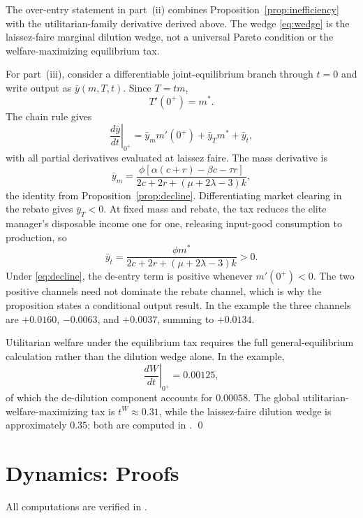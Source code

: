 \documentclass[12pt,letterpaper]{article}
\theoremstyle{definition}
\begin{document}
The over-entry statement in part~(ii) combines Proposition~\ref{prop:inefficiency} with the utilitarian-family derivative derived above.
The wedge \eqref{eq:wedge} is the laissez-faire marginal dilution wedge, not a universal Pareto condition or the welfare-maximizing equilibrium tax.

For part~(iii), consider a differentiable joint-equilibrium branch through $t=0$ and write output as $\bar y(m,T,t)$.
Since $T=tm$,
\[
  T'(0^+)=m^\ast.
\]
The chain rule gives
\[
  \left.\frac{d\bar y}{dt}\right|_{0^+}
  =
  \bar y_m m'(0^+)+\bar y_Tm^\ast+\bar y_t,
\]
with all partial derivatives evaluated at laissez faire.
The mass derivative is
\[
  \bar y_m
  =
  \frac{\phi[\alpha(c+r)-\beta c-\tau r]}
  {2c+2r+(\mu+2\lambda-3)k},
\]
the identity from Proposition~\ref{prop:decline}.
Differentiating market clearing in the rebate gives $\bar y_T<0$.
At fixed mass and rebate, the tax reduces the elite manager's disposable income one for one, releasing input-good consumption to production, so
\[
  \bar y_t
  =
  \frac{\phi m^\ast}
  {2c+2r+(\mu+2\lambda-3)k}>0.
\]
Under \eqref{eq:decline}, the de-entry term is positive whenever $m'(0^+)<0$.
The two positive channels need not dominate the rebate channel, which is why the proposition states a conditional output result.
In the example the three channels are $+0.0160$, $-0.0063$, and $+0.0037$, summing to $+0.0134$.

Utilitarian welfare under the equilibrium tax requires the full general-equilibrium calculation rather than the dilution wedge alone.
In the example,
\[
  \left.\frac{dW}{dt}\right|_{0^+}=0.00125,
\]
of which the de-dilution component accounts for $0.00058$.
The global utilitarian-welfare-maximizing tax is $t^W\approx0.31$, while the laissez-faire dilution wedge is approximately $0.35$; both are computed in .
\qed

\section{Dynamics: Proofs}\label{app:dynamics}

All computations are verified in .
\end{document}
